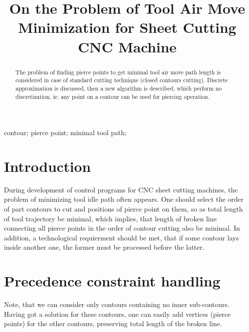 \documentclass{../download/tPRS2e}
\begin{document}
\title{On the Problem of Tool Air Move Minimization for Sheet Cutting CNC Machine}

\author{
}

\maketitle

\begin{abstract}
The problem of finding pierce points to get
minimal tool air move path length is considered
in case of standard cutting technique
(closed contours cutting).
Discrete approximation is discussed,
then a new algorithm is described,
which perform no discretization,
ie. any point on a contour can be 
used for piercing operation.
\end{abstract}

\begin{keywords}
    contour;
    pierce point;
    minimal tool path;
\end{keywords}

\section{Introduction}

During development of control programs for
CNC sheet cutting machines,
the problem of minimizing tool idle path
often appears.
One should select the order
of part contours to cut
and positions of pierce point on them,
so as total length of tool trajectory be minimal,
which implies,
that length of broken line connecting all
pierce points in the order of contour cutting
also be minimal.
In addition, a technological requierment should be met,
that if some contour lays inside another one,
the former must be processed before the latter.

\section{Precedence constraint handling}

Note, that we can consider
only contours containing no inner sub-contours.
Having got a solution for these contours,
one can easily add vertices
(pierce points) for the other contours,
preserving total length of the broken line.
\end{document}

